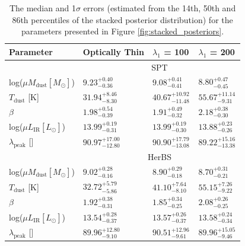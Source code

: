 \begin{table}
    \centering
    \begin{tabular}{p{3cm}|p{2.5cm}|p{2.5cm}|p{2.5cm}}
        \hline
		\hline
		Parameter & Optically Thin & $\lambda_1$ = 100\,\micron & $\lambda_1$ = 200\,\micron \\
		\hline
		\hline
		 & \multicolumn{3}{c}{SPT} \\
        \hline
        log($\mu M_{\textrm{dust}} [M_\odot]$) & $9.23_{-0.36}^{+0.40}$ & $9.08_{-0.41}^{+0.41}$ & $8.80_{-0.45}^{+0.47}$ \\
		$T_{\textrm{dust}}$ [K] & $31.94_{-8.30}^{+8.46}$ & $40.67_{-11.48}^{+10.92}$ & $55.67_{-9.31}^{+11.14}$ \\
		$\beta$ & $1.98_{-0.39}^{+0.54}$ & $1.91_{-0.32}^{+0.49}$ & $2.18_{-0.30}^{+0.38}$ \\
		log($\mu L_{\textrm{IR}} [L_\odot]$) & $13.99_{-0.31}^{+0.19}$ & $13.99_{-0.30}^{+0.19}$ & $13.88_{-0.26}^{+0.23}$ \\
		$\lambda_{\textrm{peak}}$ [\micron] & $90.97_{-12.80}^{+17.00}$ & $90.90_{-13.08}^{+17.79}$ & $89.22_{-13.38}^{+15.16}$ \\
		\hline
		& \multicolumn{3}{c}{HerBS} \\
        \hline
        log($\mu M_{\textrm{dust}} [M_\odot]$) & $9.02_{-0.16}^{+0.28}$ & $8.90_{-0.18}^{+0.29}$ & $8.70_{-0.21}^{+0.31}$ \\
		$T_{\textrm{dust}}$ [K] & $32.72_{-5.86}^{+5.79}$ & $41.10_{-8.10}^{+7.64}$ & $55.15_{-9.22}^{+7.26}$ \\
		$\beta$ & $1.92_{-0.31}^{+0.38}$ & $1.85_{-0.25}^{+0.34}$ & $2.08_{-0.25}^{+0.26}$ \\
		log($\mu L_{\textrm{IR}} [L_\odot]$) & $13.54_{-0.37}^{+0.28}$ & $13.57_{-0.37}^{+0.26}$ & $13.58_{-0.34}^{+0.24}$ \\
		$\lambda_{\textrm{peak}}$ [\micron] & $89.96_{-9.10}^{+12.80}$ & $90.51_{-9.61}^{+12.96}$ & $89.96_{-9.46}^{+15.05}$ \\
        \hline
    \end{tabular}
    \caption{The median and 1$\sigma$ errors (estimated from the 14th, 50th and 86th percentiles of the stacked posterior distribution) for the parameters presented in Figure \ref{fig:stacked_posteriors}.}
    \label{tab:parameter_results}
\end{table}

